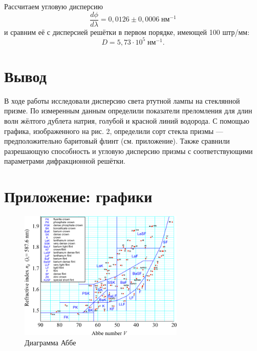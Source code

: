\documentclass[a4paper]{article}
\begin{document}
\noindent Рассчитаем угловую дисперсию $$\frac{d\phi}{d\lambda} = 0,0126 \pm 0,0006 \;\text{нм}^{-1}$$ и сравним её с дисперсией решётки в первом порядке, имеющей 100 штр/мм: $$D = 5,73 \cdot 10^5 \;\text{нм}^{-1}.$$

\section{Вывод}

В ходе работы исследовали дисперсию света ртутной лампы на стеклянной призме. По измеренным данным определили показатели преломления для длин волн жёлтого дублета натрия, голубой и красной линий водорода. С помощью графика, изображенного на рис. 2, определили сорт стекла призмы --- предположительно баритовый флинт (см. приложение). Также сравнили разрешающую способность и угловую дисперсию призмы с соответствующими параметрами дифракционной решётки.
\section{Приложение: графики}

\begin{figure}[ht!]
    \centering
    \includegraphics[width = 0.7\textwidth]{image/pic3.png}
    \caption{Диаграмма Аббе}
\end{figure}
\end{document}
